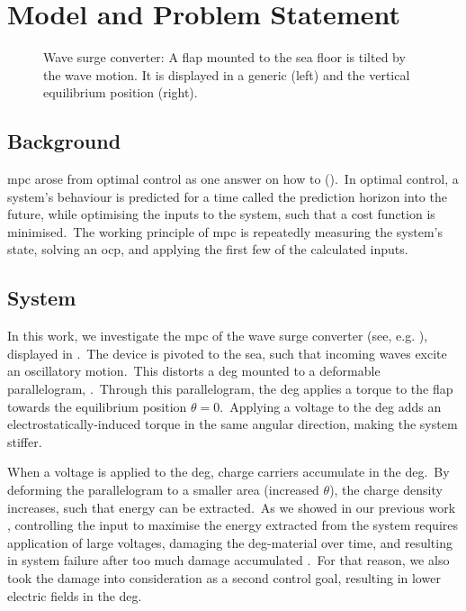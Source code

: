 \section{Model and Problem Statement}

\begin{figure}[htb]
	\centering
	\fontsize{9}{0}\selectfont
	\def\svgwidth{0.5\textwidth}
	
	\caption{Wave surge converter: A flap mounted to the sea floor is tilted by the wave motion. It is displayed in a generic (left) and the vertical equilibrium position (right).}%
\label{fig:flap}
\end{figure}

\subsection{Background}
\ac{mpc} arose from optimal control as one answer on how to  (\cite{rawlings2017mpc}).\ 
In optimal control, a system's behaviour is predicted for a time called the prediction horizon \tf into the future, while optimising the inputs to the system, such that a cost function is minimised.\
The working principle of \ac{mpc} is repeatedly measuring the system's state, solving an \ac{ocp}, and applying the first few of the calculated inputs.\

\subsection{System}
In this work, we investigate the \ac{mpc} of the wave surge converter (see, e.g. \cite{Whittaker2012}), displayed in .\
The device is pivoted to the sea, such that incoming waves excite an oscillatory motion.\ 
This distorts a \ac{deg} mounted to a deformable parallelogram, \cite{Moretti2014}.\ 
Through this parallelogram, the \ac{deg} applies a torque to the flap towards the equilibrium position $\theta=0$.\ 
Applying a voltage to the \ac{deg} adds an electrostatically-induced torque in the same angular direction, making the system stiffer.\ 

When a voltage is applied to the \ac{deg}, charge carriers accumulate in the \ac{deg}.\ 
By deforming the parallelogram to a smaller area (increased $\theta$), the charge density increases, such that energy can be extracted.\  
As we showed in our previous work \cite{Hoffmann2022moocp_wcdeg}, controlling the input to maximise the energy extracted from the system requires application of large voltages, damaging the \ac{deg}-material over time, and resulting in system failure after too much damage accumulated \cite{Chen2019}.\
For that reason, we also took the damage into consideration as a second control goal, resulting in lower electric fields in the \ac{deg}.

